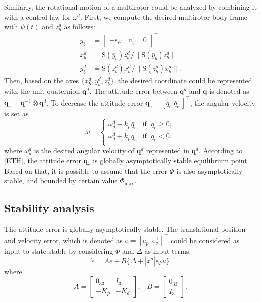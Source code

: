 \documentclass[letterpaper, 10 pt, conference]{ieeeconf}  %
\begin{document}
Similarly, the rotational motion of a multirotor could be analyzed by combining it with a control law for $\omega^d$. 
First, we compute the desired multirotor body frame with $\psi(t)$ and $z_b^d$ as follows:
\begin{align}
\bar{y}_b &= [\begin{array}{ccc}-\text{s}_{\psi^r}&\text{c}_{\psi^r}&0\end{array}]^\intercal \nonumber \\
x_b^d &= \text{S}(\bar{y}_b)z_b^d / \|\text{S}(\bar{y}_b)z_b^d \| \nonumber \\ 
y_b^d &= \text{S}({z}_b^d)x_b^d / \|\text{S}(z_b^d)x_b^d \|. \nonumber  
\end{align}
Then, based on the axes $\{x_b^d,y_b^d,z_b^d\}$, the desired coordinate could be represented with the unit quaternion $\textbf{q}^d$. 
The attitude error between $\textbf{q}^d$ and $\textbf{q}$ is denoted as $\textbf{q}_e = \textbf{q}^{-1}\otimes \textbf{q}^d$. To decrease the attitude error $\textbf{q}_e = [q_e\;\bar{q}_e^\intercal]^\intercal$, the angular velocity is set as 
\begin{equation}
\omega = \left\{
\begin{array}{ll}
\omega_d^d - k_p \bar{q}_e & \text{if  }\;q_e \geq 0, \\ 
\omega_d^d + k_p \bar{q}_e & \text{if  }\;q_e < 0. \\ 
\end{array}
\right.
\end{equation}
where $\omega_d^d$ is the desired angular velocity of $\textbf{q}^d$ represented in $\textbf{q}^d$.
According to [ETH], the attitude error $\textbf{q}_e$ is globally asymptotically stable equilibrium point. Based on that, it is possible to assume that the error $\Phi$ is also asymptotically stable, and bounded by certain value $\Phi_\text{max}$.

\subsection{Stability analysis}
The attitude error is globally asymptotically stable.
The translational position and velocity error, which is denoted as $e = [e_p^\intercal\;e_v^\intercal]^\intercal$ could be considered as input-to-state stable by considering $\Phi$ and $\Delta$ as input terms. 
\begin{equation}
\dot{e} = Ae
 + B\{\Delta+|\ddot{x}^d|\text{s}_\Phi\bar{u}\} \label{eq:translationalError} 
\end{equation}
where
\begin{equation}
A = \left[
\begin{array}{rr}
0_{33} & I_3 \\ -K_p & -K_d 
\end{array}
\right],\;\;\;B = \left[
\begin{array}{r}
0_{33} \\ I_3
\end{array}
\right]. 
\end{equation}
\end{document}
